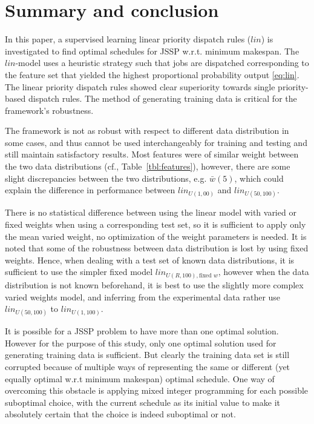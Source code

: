 \documentclass[10pt]{llncs}
\begin{document}
\section{Summary and conclusion}
In this paper, a supervised learning linear priority dispatch rules ($lin$) is investi\-gated to find optimal schedules for JSSP w.r.t. minimum makespan. The $lin$-model uses a heuristic strategy such that jobs are dispatched corresponding to the feature set that yielded the highest proportional probability output \eqref{eq:lin}. The linear priority dispatch rules showed clear superiority towards single priority-based dispatch rules. The method of generating training data is  critical for the framework's robustness.  

The framework is not as robust with respect to different data distribution in some cases, and thus cannot be used interchangeably for training and testing and still maintain satisfactory results. Most features were of similar weight between the two data distributions (cf., Table~\ref{tbl:features}), however, there are some slight discrepancies between the two distributions, e.g. $\bar{w}(5)$, which could explain the difference in performance between $lin_{U(1,00)}$ and $lin_{U(50,100)}$.  

There is no statistical difference between using the linear model with varied or fixed weights when using a corresponding test set, so it is sufficient to apply only the mean varied weight, no optimization of the weight parameters is needed. It is noted that some of the robustness between data distribution is lost by using fixed weights. Hence, when dealing with a test set of known data distributions, it is sufficient to use the simpler fixed model $lin_{U(R,100),\textrm{fixed }w}$, however when the data distribution is not known beforehand, it is best to use the slightly more complex varied weights model, and inferring from the experimental data rather use $lin_{U(50,100)}$ to $lin_{U(1,100)}$.

It is possible for a JSSP problem to have more than one optimal solution. However for the purpose of this study, only one optimal solution used for generating training data is sufficient. But clearly the training data set is still corrupted because of multiple ways of representing the same or different (yet equally optimal w.r.t minimum makespan) optimal schedule. One way of overcoming this obstacle is applying mixed integer programming for each possible suboptimal choice, with the current schedule as its initial value to make it absolutely certain that the choice is indeed suboptimal or not. 
\end{document}
